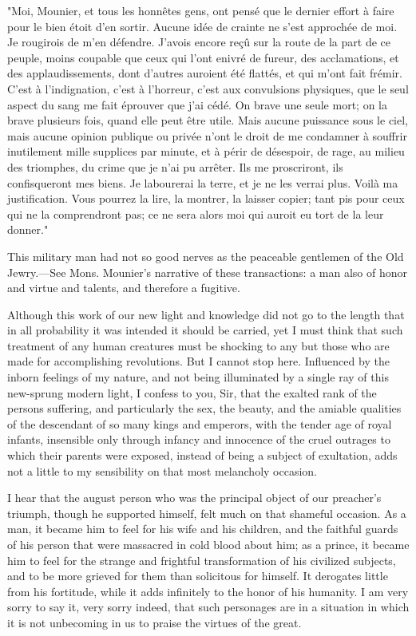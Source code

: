 {"Moi, Mounier, et tous les honnêtes gens, ont pensé que le dernier effort à faire pour le bien étoit d'en sortir. Aucune idée de crainte ne s'est approchée de moi. Je rougirois de m'en défendre. J'avois encore reçû sur la route de la part de ce peuple, moins coupable que ceux qui l'ont enivré de fureur, des acclamations, et des applaudissements, dont d'autres auroient été flattés, et qui m'ont fait frémir. C'est à l'indignation, c'est à l'horreur, c'est aux convulsions physiques, que le seul aspect du sang me fait éprouver que j'ai cédé. On brave une seule mort; on la brave plusieurs fois, quand elle peut être utile. Mais aucune puissance sous le ciel, mais aucune opinion publique ou privée n'ont le droit de me condamner à souffrir inutilement mille supplices par minute, et à périr de désespoir, de rage, au milieu des triomphes, du crime que je n'ai pu arrêter. Ils me proscriront, ils confisqueront mes biens. Je labourerai la terre, et je ne les verrai plus. Voilà ma justification. Vous pourrez la lire, la montrer, la laisser copier; tant pis pour ceux qui ne la comprendront pas; ce ne sera alors moi qui auroit eu tort de la leur donner."

This military man had not so good nerves as the peaceable gentlemen of the Old Jewry.—See Mons. Mounier's narrative of these transactions: a man also of honor and virtue and talents, and therefore a fugitive.
}

Although this work of our new light and knowledge did not go to the length that in all probability it was intended it should be carried, yet I must think that such treatment of any human creatures must be shocking to any but those who are made for accomplishing revolutions. But I cannot stop here. Influenced by the inborn feelings of my nature, and not being illuminated by a single ray of this new-sprung modern light, I confess to you, Sir, that the exalted rank of the persons suffering, and particularly the sex, the beauty, and the amiable qualities of the descendant of so many kings and emperors, with the tender age of royal infants, insensible only through infancy and innocence of the cruel outrages to which their parents were exposed, instead of being a subject of exultation, adds not a little to my sensibility on that most melancholy occasion.

I hear that the august person who was the principal object of our preacher's triumph, though he supported himself, felt much on that shameful occasion. As a man, it became him to feel for his wife and his children, and the faithful guards of his person that were massacred in cold blood about him; as a prince, it became him to feel for the strange and frightful transformation of his civilized subjects, and to be more grieved for them than solicitous for himself. It derogates little from his fortitude, while it adds infinitely to the honor of his humanity. I am very sorry to say it, very sorry indeed, that such personages are in a situation in which it is not unbecoming in us to praise the virtues of the great.

